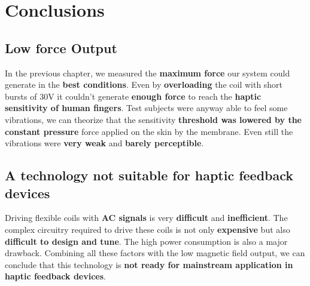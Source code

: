 \section{Conclusions}
\subsection{Low force Output}
In the previous chapter, we measured the \textbf{maximum force} our system could generate in the \textbf{best conditions}.
Even by \textbf{overloading} the coil with short bursts of 30V it couldn't generate \textbf{enough force} to reach the \textbf{haptic sensitivity of human fingers}. Test subjects were anyway able to feel some vibrations, we can theorize that the sensitivity \textbf{threshold was lowered by the constant pressure} force applied on the skin by the membrane.
Even still the vibrations were \textbf{very weak} and \textbf{barely perceptible}.
\subsection{A technology not suitable for haptic feedback devices}
Driving flexible coils with \textbf{AC signals} is very \textbf{difficult} and \textbf{inefficient}.
The complex circuitry required to drive these coils is not only \textbf{expensive} but also \textbf{difficult to design and tune}.
The high power consumption is also a major drawback.
Combining all these factors with the low magnetic field output, we can conclude that this technology is \textbf{not ready for mainstream application in haptic feedback devices}.